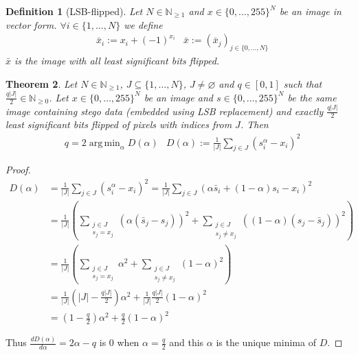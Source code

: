 \documentclass[10pt,a4paper,parskip=half]{scrartcl}
\let\emptyset\varnothing
\theoremstyle{plain}
\newtheorem{theorem}{Theorem}[section]
\newtheorem{definition}[theorem]{Definition}
\DeclareMathOperator*{\argmin}{arg\,min}
\begin{document}
\begin{definition}[LSB-flipped]
    Let $N \in \mathbb{N}_{\ge 1}$ and $x \in \{0, \dots, 255\}^N$ be an image
    in vector form. $\forall i \in \{1, \dots, N\}$ we define
    \begin{align*}
        & \bar{x}_i := x_i + (-1)^{x_i}
        & \bar{x}   := \left(\bar{x}_j\right)_{j \in \{0, \dots, N\}}
    \end{align*}
    $\bar{x}$ is the image with all least significant bits flipped.
\end{definition}

\begin{theorem}
    \label{theo:t1_parts}
    Let $N \in \mathbb{N}_{\ge 1}$, $J \subseteq \{1, \dots, N\}$, $J \neq
    \emptyset$ and $q \in \left[0, 1\right]$ such that $\frac{q |J|}{2} \in
    \mathbb{N}_{\ge 0}$. Let $x \in \{0, \dots, 255\}^N$ be an image and $s \in
    \{0, \dots, 255\}^N$ be the same image containing stego data (embedded
    using LSB replacement) and exactly $\frac{q |J|}{2}$ least significant bits
    flipped of pixels with indices from $J$.
    Then
    \begin{align*}
        & q = 2 \argmin_\alpha D(\alpha)
        & D(\alpha) := \frac{1}{|J|} \sum\limits_{j \in J} \left(s_i^\alpha - x_i\right)^2
    \end{align*}
\end{theorem}

\begin{proof}
    \begin{align*}
        D(\alpha) &= \frac{1}{|J|} \sum\limits_{j \in J} \left(s_i^\alpha - x_i\right)^2 = \frac{1}{|J|} \sum\limits_{j \in J} \left(\alpha \bar{s}_i + (1-\alpha) s_i - x_i\right)^2\\
                  &= \frac{1}{|J|} \left(\sum\limits_{\substack{j \in J\\ s_j = x_j}} \left(\alpha (\bar{s}_j - s_j)\right)^2 + \sum\limits_{\substack{j \in J\\ s_j \neq x_j}} \left((1 - \alpha) (s_j - \bar{s}_j)\right)^2 \right)\\
                  &= \frac{1}{|J|} \left(\sum\limits_{\substack{j \in J\\ s_j = x_j}} \alpha^2 + \sum\limits_{\substack{j \in J\\ s_j \neq x_j}} (1-\alpha)^2 \right)\\
                  &= \frac{1}{|J|} \left(|J| - \frac{q |J|}{2}\right) \alpha^2 + \frac{1}{|J|} \frac{q |J|}{2} (1 - \alpha)^2\\
                  &= \left(1 - \frac{q}{2}\right) \alpha^2 + \frac{q}{2} (1-\alpha)^2
    \end{align*}

    Thus $\frac{d D(\alpha)}{d\alpha} = 2 \alpha - q $ is $0$ when $\alpha =
    \frac{q}{2}$ and this $\alpha$ is the unique minima of $D$.
\end{proof}
\end{document}
